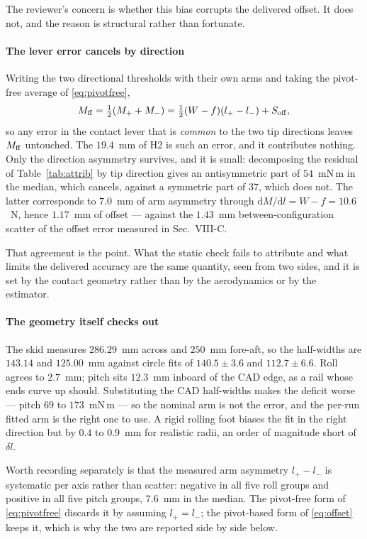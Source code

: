 \documentclass[10pt]{article}
\begin{document}
The reviewer's concern is whether this bias corrupts the delivered
offset. It does not, and the reason is structural rather than
fortunate.

\paragraph{The lever error cancels by direction}
Writing the two directional thresholds with their own arms and taking
the pivot-free average of \eqref{eq:pivotfree},
\begin{equation}
  M_{\rm ff} = \tfrac12(M_+ + M_-)
             = \tfrac12 (W-f)(l_+ - l_-) + S_{\rm off} ,
  \label{eq:ffcancel}
\end{equation}
so any error in the contact lever that is \emph{common} to the two tip
directions leaves $M_{\rm ff}$ untouched. The $19.4$~mm of H2 is such
an error, and it contributes nothing. Only the direction asymmetry
survives, and it is small: decomposing the residual of
Table~\ref{tab:attrib} by tip direction gives an antisymmetric part of
$54$~mN\,m in the median, which cancels, against a symmetric part of
$37$, which does not. The latter corresponds to $7.0$~mm of arm
asymmetry through $\mathrm{d}M/\mathrm{d}l = W - f = 10.6$~N, hence
$1.17$~mm of offset --- against the $1.43$~mm between-configuration
scatter of the offset error measured in Sec.~VIII-C.

That agreement is the point. What the static check fails to attribute
and what limits the delivered accuracy are the same quantity, seen from
two sides, and it is set by the contact geometry rather than by the
aerodynamics or by the estimator.

\paragraph{The geometry itself checks out}
The skid measures $286.29$~mm across and $250$~mm fore-aft, so the
half-widths are $143.14$ and $125.00$~mm against circle fits of
$140.5\pm3.6$ and $112.7\pm6.6$. Roll agrees to $2.7$~mm; pitch sits
$12.3$~mm inboard of the CAD edge, as a rail whose ends curve up
should. Substituting the CAD half-widths makes the deficit worse ---
pitch $69$ to $173$~mN\,m --- so the nominal arm is not the error, and
the per-run fitted arm is the right one to use. A rigid rolling foot
biases the fit in the right direction but by $0.4$ to $0.9$~mm for
realistic radii, an order of magnitude short of $\delta l$.

Worth recording separately is that the measured arm asymmetry
$l_+ - l_-$ is systematic per axis rather than scatter: negative in all
five roll groups and positive in all five pitch groups, $7.6$~mm in the
median. The pivot-free form of \eqref{eq:pivotfree} discards it by
assuming $l_+ = l_-$; the pivot-based form of \eqref{eq:offset} keeps
it, which is why the two are reported side by side below.
\end{document}
